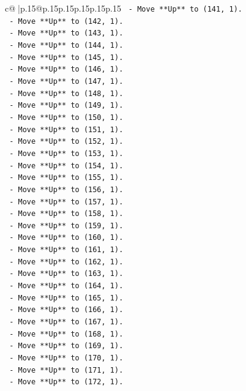 \documentclass{article}
\begin{document}
{\begin{supertabular}{c@{$\;$}|p{.15\linewidth}@{}p{.15\linewidth}p{.15\linewidth}p{.15\linewidth}p{.15\linewidth}p{.15\linewidth}}
{{{\texttt{  {-} Move **Up** to (141, 1).} \\
\texttt{  {-} Move **Up** to (142, 1).} \\
\texttt{  {-} Move **Up** to (143, 1).} \\
\texttt{  {-} Move **Up** to (144, 1).} \\
\texttt{  {-} Move **Up** to (145, 1).} \\
\texttt{  {-} Move **Up** to (146, 1).} \\
\texttt{  {-} Move **Up** to (147, 1).} \\
\texttt{  {-} Move **Up** to (148, 1).} \\
\texttt{  {-} Move **Up** to (149, 1).} \\
\texttt{  {-} Move **Up** to (150, 1).} \\
\texttt{  {-} Move **Up** to (151, 1).} \\
\texttt{  {-} Move **Up** to (152, 1).} \\
\texttt{  {-} Move **Up** to (153, 1).} \\
\texttt{  {-} Move **Up** to (154, 1).} \\
\texttt{  {-} Move **Up** to (155, 1).} \\
\texttt{  {-} Move **Up** to (156, 1).} \\
\texttt{  {-} Move **Up** to (157, 1).} \\
\texttt{  {-} Move **Up** to (158, 1).} \\
\texttt{  {-} Move **Up** to (159, 1).} \\
\texttt{  {-} Move **Up** to (160, 1).} \\
\texttt{  {-} Move **Up** to (161, 1).} \\
\texttt{  {-} Move **Up** to (162, 1).} \\
\texttt{  {-} Move **Up** to (163, 1).} \\
\texttt{  {-} Move **Up** to (164, 1).} \\
\texttt{  {-} Move **Up** to (165, 1).} \\
\texttt{  {-} Move **Up** to (166, 1).} \\
\texttt{  {-} Move **Up** to (167, 1).} \\
\texttt{  {-} Move **Up** to (168, 1).} \\
\texttt{  {-} Move **Up** to (169, 1).} \\
\texttt{  {-} Move **Up** to (170, 1).} \\
\texttt{  {-} Move **Up** to (171, 1).} \\
\texttt{  {-} Move **Up** to (172, 1).} \\
}}}
\end{supertabular}}
\end{document}
